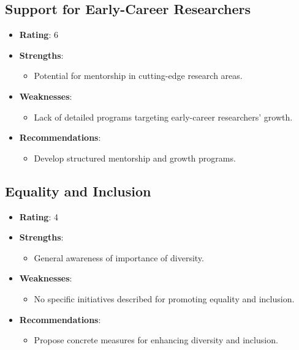 \documentclass{article}
\begin{document}
\subsection{Support for Early-Career Researchers}
\begin{itemize}
    \item \textbf{Rating}: 6
    \item \textbf{Strengths}: 
    \begin{itemize}
        \item Potential for mentorship in cutting-edge research areas.
    \end{itemize}
    \item \textbf{Weaknesses}: 
    \begin{itemize}
        \item Lack of detailed programs targeting early-career researchers' growth.
    \end{itemize}
    \item \textbf{Recommendations}: 
    \begin{itemize}
        \item Develop structured mentorship and growth programs.
    \end{itemize}
\end{itemize}

\subsection{Equality and Inclusion}
\begin{itemize}
    \item \textbf{Rating}: 4
    \item \textbf{Strengths}: 
    \begin{itemize}
        \item General awareness of importance of diversity.
    \end{itemize}
    \item \textbf{Weaknesses}: 
    \begin{itemize}
        \item No specific initiatives described for promoting equality and inclusion.
    \end{itemize}
    \item \textbf{Recommendations}: 
    \begin{itemize}
        \item Propose concrete measures for enhancing diversity and inclusion.
    \end{itemize}
\end{itemize}
\end{document}
